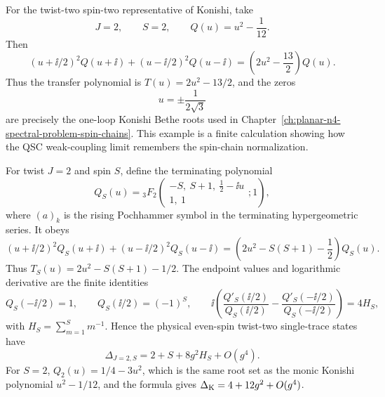 \begin{example}
\label{ex:planar-n4-konishi-baxter-polynomial}
For the twist-two spin-two representative of Konishi, take
\[
  J=2,\qquad S=2,\qquad
  Q(u)=u^2-\frac1{12}.
\]
Then
\[
  (u+\ii/2)^2Q(u+\ii)+(u-\ii/2)^2Q(u-\ii)
  =
  \left(2u^2-\frac{13}{2}\right)Q(u).
\]
Thus the transfer polynomial is \(T(u)=2u^2-13/2\), and the zeros
\[
  u=\pm\frac{1}{2\sqrt3}
\]
are precisely the one-loop Konishi Bethe roots used in
Chapter~\ref{ch:planar-n4-spectral-problem-spin-chains}.  This example is a
finite calculation showing how the QSC weak-coupling limit remembers the
spin-chain normalization.
\end{example}

\begin{proposition}
\label{prop:planar-n4-twist-two-baxter-family}
For twist \(J=2\) and spin \(S\), define the terminating polynomial
\[
  Q_S(u)
  =
  {}_3F_2\!\left(
    \begin{matrix}
      -S,\ S+1,\ \frac12-\ii u\\
      1,\ 1
    \end{matrix}
    ;1
  \right),
\]
where \((a)_k\) is the rising Pochhammer symbol in the terminating
hypergeometric series.  It obeys
\[
  (u+\ii/2)^2Q_S(u+\ii)
  +(u-\ii/2)^2Q_S(u-\ii)
  =
  \left(2u^2-S(S+1)-\frac12\right)Q_S(u).
\]
Thus \(T_S(u)=2u^2-S(S+1)-1/2\).  The endpoint values and logarithmic
derivative are the finite identities
\[
  Q_S(-\ii/2)=1,\qquad
  Q_S(\ii/2)=(-1)^S,\qquad
  \ii\left(
  \frac{Q'_S(\ii/2)}{Q_S(\ii/2)}
  -
  \frac{Q'_S(-\ii/2)}{Q_S(-\ii/2)}
  \right)
  =
  4H_S,
\]
with \(H_S=\sum_{m=1}^S m^{-1}\).  Hence the physical even-spin twist-two
single-trace states have
\[
  \Delta_{J=2,S}
  =
  2+S+8g^2H_S+O(g^4).
\]
For \(S=2\), \(Q_2(u)=1/4-3u^2\), which is the same root set as the monic
Konishi polynomial \(u^2-1/12\), and the formula gives
\(\Delta_{\rm K}=4+12g^2+O(g^4)\).
\end{proposition}

